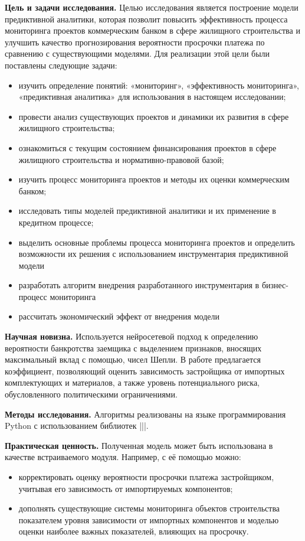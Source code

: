 \documentclass[12pt,a4paper]{article} %
\begin{document}
\textbf{Цель и задачи исследования.} Целью исследования является построение модели предиктивной аналитики, которая позволит повысить эффективность процесса мониторинга проектов коммерческим банком в сфере жилищного строительства и улучшить качество прогнозирования вероятности просрочки платежа по сравнению с существующими моделями. Для реализации этой цели были поставлены следующие задачи:
\begin{itemize}
	\item изучить определение понятий: «мониторинг», «эффективность мониторинга», «предиктивная аналитика» для использования в настоящем исследовании;
	\item провести анализ существующих проектов и динамики их развития в сфере жилищного строительства;
	\item ознакомиться с текущим состоянием финансирования проектов в сфере жилищного строительства и нормативно-правовой базой;
	\item изучить процесс мониторинга проектов и методы их оценки коммерческим банком;
	\item исследовать типы моделей предиктивной аналитики и их применение в кредитном процессе;
	\item выделить основные проблемы процесса мониторинга проектов и определить возможности их решения с использованием инструментария предиктивной модели 
	\item разработать алгоритм внедрения разработанного инструментария в бизнес-процесс мониторинга
	\item рассчитать экономический эффект от внедрения модели 
\end{itemize}

\bigskip

\textbf{Научная новизна.} Используется нейросетевой подход к определению вероятности банкротства заемщика с выделением признаков, вносящих максимальный вклад с помощью, чисел Шепли. В работе предлагается коэффициент, позволяющий оценить зависимость застройщика от импортных комплектующих и материалов, а также уровень потенциального риска, обусловленного политическими ограничениями.

\bigskip

\textbf{Методы исследования.} Алгоритмы реализованы на языке программирования Python с использованием библиотек |||.

\bigskip

\textbf{Практическая ценность.} Полученная модель может быть использована в качестве встраиваемого модуля. Например, с её помощью можно:
\begin{itemize}
	\item корректировать оценку вероятности просрочки платежа застройщиком, учитывая его зависимость от импортируемых компонентов;
	\item дополнять существующие системы мониторинга объектов строительства показателем уровня зависимости от импортных компонентов и моделью оценки наиболее важных показателей, влияющих на просрочку.
\end{itemize}
\end{document}
